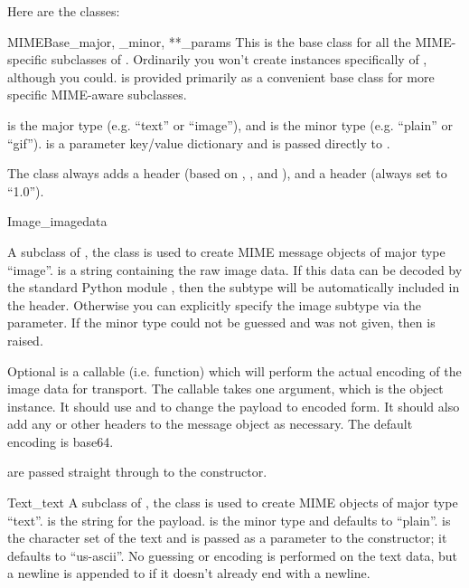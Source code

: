 \documentclass{howto}
\begin{document}
Here are the classes:

\begin{classdesc}{MIMEBase}{_major, _minor, **_params}
This is the base class for all the MIME-specific subclasses of
.  Ordinarily you won't create instances specifically
of , although you could.   is provided
primarily as a convenient base class for more specific MIME-aware
subclasses.

 is the  major type (e.g. ``text'' or
``image''), and  is the  minor type
(e.g. ``plain'' or ``gif'').   is a parameter key/value
dictionary and is passed directly to .

The  class always adds a  header
(based on , , and ), and a
 header (always set to ``1.0'').
\end{classdesc}

\begin{classdesc}{Image}{_imagedata}

A subclass of , the  class is used to
create MIME message objects of major type ``image''.  
is a string containing the raw image data.  If this data can be
decoded by the standard Python module , then the
subtype will be automatically included in the 
header.  Otherwise you can explicitly specify the image subtype via
the  parameter.  If the minor type could not be guessed
and  was not given, then  is raised.

Optional  is a callable (i.e. function) which will
perform the actual encoding of the image data for transport.  The
callable takes one argument, which is the  object
instance.  It should use  and
 to change the payload to encoded form.  It
should also add any
 or other headers to the message
object as necessary.  The default encoding is base64.

 are passed straight through to the 
constructor.
\end{classdesc}

\begin{classdesc}{Text}{_text}
A subclass of , the  class is used to
create MIME objects of major type ``text''.   is the string
for the payload.   is the minor type and defaults to
``plain''.   is the character set of the text and is
passed as a parameter to the  constructor; it defaults
to ``us-ascii''.  No guessing or encoding is performed on the text
data, but a newline is appended to  if it doesn't already
end with a newline.
\end{classdesc}
\end{document}
